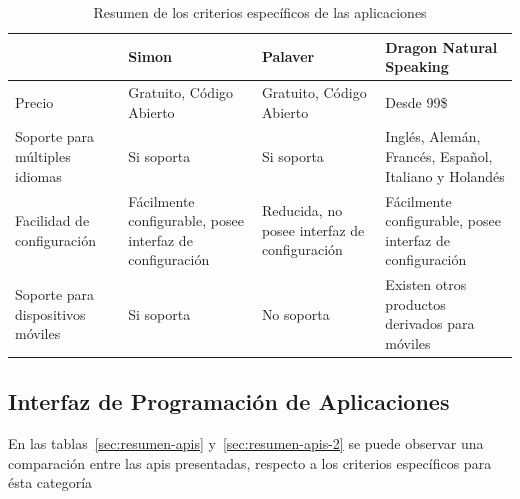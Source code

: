 \begin{table}[H]
\centering
\footnotesize
\begin{tabular}{|p{3.5cm}|p{3.5cm}|p{3.5cm}|p{3.5cm}|}
\hline
                                      &  Simon                                                       &  Palaver                                       & Dragon Natural Speaking \\
\hline
Precio                                & Gratuito, C\'odigo Abierto                                   & Gratuito, C\'odigo Abierto                     & Desde 99\$  \\
Soporte para m\'ultiples idiomas      & Si soporta                                                   & Si soporta                                     & Ingl\'es, Alem\'an, Franc\'es, Espa\~nol, Italiano y Holand\'es \\
Facilidad de configuraci\'on          & F\'acilmente configurable, posee interfaz de configuraci\'on & Reducida, no posee interfaz de configuraci\'on & F\'acilmente configurable, posee interfaz de configuraci\'on \\
Soporte para dispositivos m\'oviles   & Si soporta                                                   & No soporta                                     & Existen otros productos derivados para m\'oviles \\
\hline
\end{tabular}
\caption{Resumen de los criterios espec\'ificos de las aplicaciones}
\label{sec:resumen-aplicaciones}
\end{table}

\subsection{Interfaz de Programaci\'on de Aplicaciones}

En las tablas~\ref{sec:resumen-apis} y~\ref{sec:resumen-apis-2} se puede observar una comparaci\'on entre las \gls{api}s presentadas, respecto a los criterios espec\'ificos
para \'esta categor\'ia


